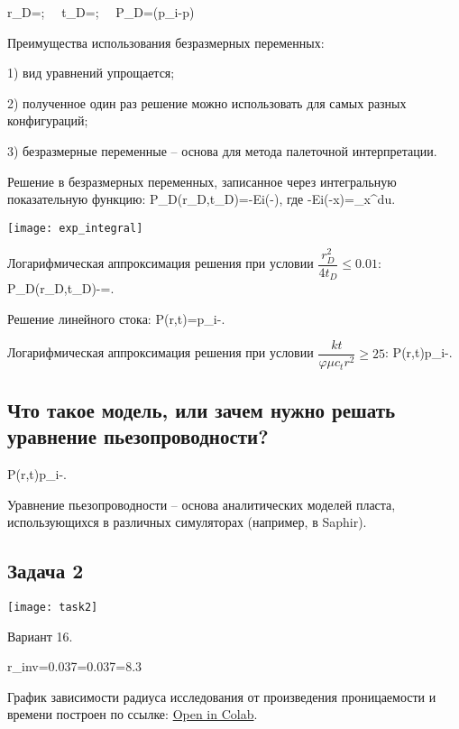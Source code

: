 \documentclass[main.tex]{subfiles}
\begin{document}
\beq
r_D=;\,\,\,\,\,\,\,\,t_D=;\,\,\,\,\,\,\,\,P_D=\left(p_i-p\right)
\eeq

Преимущества использования безразмерных переменных:

1) вид уравнений упрощается;

2) полученное один раз решение можно использовать для самых разных конфигураций;

3) безразмерные переменные -- основа для метода палеточной интерпретации.

Решение в безразмерных переменных, записанное через интегральную показательную функцию:
\beq
P_D(r_D,t_D)=-Ei\left(-\right),
\eeq
где
\beq
-Ei(-x)=\int\limits_{x}^{\infty}du.
\eeq

\texttt{[image: exp\_integral]}

Логарифмическая аппроксимация решения при условии $\dfrac{r_D^2}{4t_D}\leqslant0.01$:
\beq
P_D(r_D,t_D)\approx -=.
\eeq

Решение линейного стока:
\beq
P(r,t)=p_i-.
\eeq

Логарифмическая аппроксимация решения при условии $\dfrac{kt}{\varphi \mu c_t r^2}\geqslant25$:
\beq
P(r,t)\approx p_i-.
\eeq

\subsection{Что такое модель, или зачем нужно решать уравнение пьезопроводности?}

\beq
P(r,t)\approx p_i-.
\eeq

Уравнение пьезопроводности -- основа аналитических моделей пласта, использующихся в различных симуляторах (например, в Saphir).

\subsection{Задача 2}

\texttt{[image: task2]}

Вариант 16.

\beq
r_{inv}=0.037=0.037=8.3
\eeq

График зависимости радиуса исследования от произведения проницаемости и времени построен по ссылке: \href{https://colab.research.google.com/github/mualal/notebooks-source/blob/master/7_exploration_radius.ipynb}{Open in Colab}.


\end{document}
